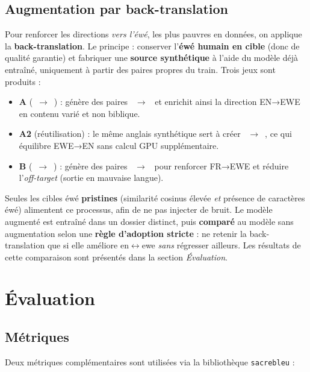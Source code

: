 \documentclass[11pt,a4paper]{article}
\begin{document}
\subsection{Augmentation par back-translation}
Pour renforcer les directions \emph{vers l'éwé}, les plus pauvres en données, on applique
la \textbf{back-translation}. Le principe : conserver l'\textbf{éwé humain en cible} (donc
de qualité garantie) et fabriquer une \textbf{source synthétique} à l'aide du modèle déjà
entraîné, uniquement à partir des paires propres  du train. Trois jeux
sont produits :

\begin{itemize}[leftmargin=1.5em,itemsep=3pt]
  \item \textbf{A} (~$\to$~) : génère des paires
        ~$\to$~ et enrichit ainsi la direction EN→EWE en contenu
        varié et non biblique.
  \item \textbf{A2} (réutilisation) : le même anglais synthétique sert à créer
        ~$\to$~, ce qui équilibre EWE→EN sans calcul GPU
        supplémentaire.
  \item \textbf{B} (~$\to$~) : génère des paires
        ~$\to$~ pour renforcer FR→EWE et réduire l'\emph{off-target}
        (sortie en mauvaise langue).
\end{itemize}

Seules les cibles éwé \textbf{pristines} (similarité cosinus élevée \emph{et} présence de
caractères éwé) alimentent ce processus, afin de ne pas injecter de bruit. Le modèle
augmenté est entraîné dans un dossier distinct, puis \textbf{comparé} au modèle sans
augmentation selon une \textbf{règle d'adoption stricte} : ne retenir la back-translation
que si elle améliore en$\leftrightarrow$ewe \emph{sans} régresser ailleurs. Les résultats
de cette comparaison sont présentés dans la section \emph{Évaluation}.

\section{Évaluation}

\subsection{Métriques}
Deux métriques complémentaires sont utilisées via la bibliothèque \texttt{sacrebleu} :
\end{document}
